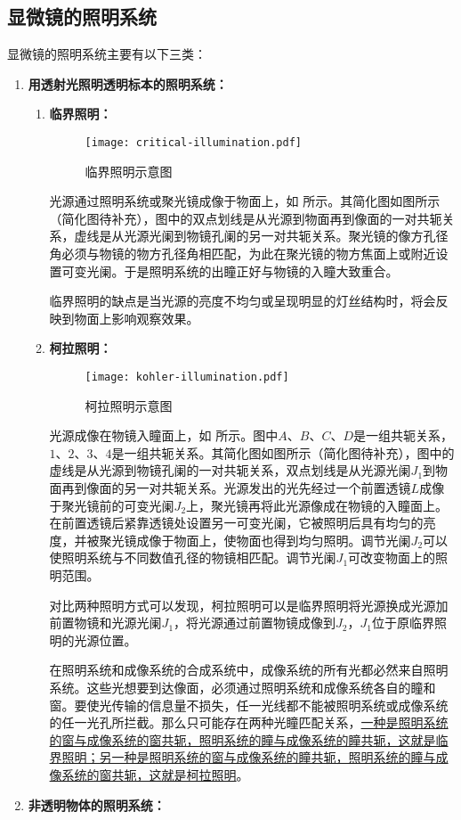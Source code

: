 \subsection{显微镜的照明系统}
显微镜的照明系统主要有以下三类：
\begin{enumerate}
	\item \textbf{用透射光照明透明标本的照明系统：}
	\begin{enumerate}
		\item \textbf{临界照明：}
		
		\begin{figure}[htbp]
			\centering
			\texttt{[image: critical-illumination.pdf]}
			\caption{临界照明示意图}
			\label{fig:critical-illumination}
		\end{figure}
		
		光源通过照明系统或聚光镜成像于物面上，如 所示。其简化图如图所示（简化图待补充），图中的双点划线是从光源到物面再到像面的一对共轭关系，虚线是从光源光阑到物镜孔阑的另一对共轭关系。聚光镜的像方孔径角必须与物镜的物方孔径角相匹配，为此在聚光镜的物方焦面上或附近设置可变光阑。于是照明系统的出瞳正好与物镜的入瞳大致重合。
		\begin{note}
			临界照明的缺点是当光源的亮度不均匀或呈现明显的灯丝结构时，将会反映到物面上影响观察效果。
		\end{note}
		\item \textbf{柯拉照明：}
		
		\begin{figure}[htbp]
			\centering
			\texttt{[image: kohler-illumination.pdf]}
			\caption{柯拉照明示意图}
			\label{fig:kohler-illumination}
		\end{figure}
		
		光源成像在物镜入瞳面上，如 所示。图中$A$、$B$、$C$、$D$是一组共轭关系，$1$、$2$、$3$、$4$是一组共轭关系。其简化图如图所示（简化图待补充），图中的虚线是从光源到物镜孔阑的一对共轭关系，双点划线是从光源光阑$J_1$到物面再到像面的另一对共轭关系。光源发出的光先经过一个前置透镜$L$成像于聚光镜前的可变光阑$J_2$上，聚光镜再将此光源像成在物镜的入瞳面上。在前置透镜后紧靠透镜处设置另一可变光阑，它被照明后具有均匀的亮度，并被聚光镜成像于物面上，使物面也得到均匀照明。调节光阑$J_2$可以使照明系统与不同数值孔径的物镜相匹配。调节光阑$J_1$可改变物面上的照明范围。
		\begin{note}
			对比两种照明方式可以发现，柯拉照明可以是临界照明将光源换成光源加前置物镜和光源光阑$J_1$，将光源通过前置物镜成像到$J_2$，$J_1$位于原临界照明的光源位置。
		\end{note}
		\begin{property}
			在照明系统和成像系统的合成系统中，成像系统的所有光都必然来自照明系统。这些光想要到达像面，必须通过照明系统和成像系统各自的瞳和窗。要使光传输的信息量不损失，任一光线都不能被照明系统或成像系统的任一光孔所拦截。那么只可能存在两种光瞳匹配关系，\uline{一种是照明系统的窗与成像系统的窗共轭，照明系统的瞳与成像系统的瞳共轭，这就是临界照明；另一种是照明系统的窗与成像系统的瞳共轭，照明系统的瞳与成像系统的窗共轭，这就是柯拉照明}。
		\end{property}
	\end{enumerate}
	\item \textbf{非透明物体的照明系统：}
	

\end{enumerate}
